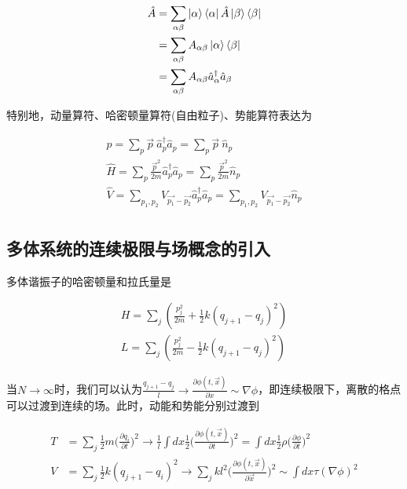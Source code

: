 \begin{equation}
	\begin{split}
		\hat{A} &= \sum_{\alpha\beta}\ket{\alpha}\bra{\alpha}\hat{A}\ket{\beta}\bra{\beta} \\
			&= \sum_{\alpha\beta}A_{\alpha\beta}\ket{\alpha}\bra{\beta} \\
			&= \sum_{\alpha\beta}A_{\alpha\beta}\hat{a}_\alpha^\dagger\hat{a}_\beta
	\end{split}
\end{equation}

特别地，动量算符、哈密顿量算符(自由粒子)、势能算符表达为

\begin{equation}
	\begin{array}{lr}
		\hat{p}= \sum_{p}\vec{p}\ \hat{a}_{p}^\dagger\hat{a}_{p}=\sum_{p}\vec{p}\ \hat{n}_{p}\\
		\hat{H}= \sum_{p}\frac{\vec{p}^2}{2m}\hat{a}_{p}^\dagger\hat{a}_{p}=\sum_{p}\frac{\vec{p}^2}{2m}\hat{n}_{p}\\
		\hat{V}= \sum_{p_{1},p_{2}}V_{\vec{p_{1}}-\vec{p_{2}}}\hat{a}_{p}^\dagger\hat{a}_{p}
           =\sum_{p_{1},p_{2}}V_{\vec{p_{1}}-\vec{p_{2}}}\hat{n}_{p}\\
	\end{array}
\end{equation}




\subsection{多体系统的连续极限与场概念的引入}

多体谐振子的哈密顿量和拉氏量是

\begin{equation}
	\begin{array}{lr}
		H=\sum_{j}(\frac{p_j^2}{2m}+\frac{1}{2}k(q_{j+1}-q_j)^2) \\
		L=\sum_{j}(\frac{p_j^2}{2m}-\frac{1}{2}k(q_{j+1}-q_j)^2)
	\end{array}
\end{equation}

当$N\to\infty$时，我们可以认为$\frac{q_{j+1}-q_j}{l}\to\frac{\partial\phi(t,\vec{x})}{\partial x}\sim\nabla\phi$，即连续极限下，离散的格点可以过渡到连续的场。此时，动能和势能分别过渡到

\begin{equation}
    \begin{split}
        T &= \sum_j\frac{1}{2}m\bigl(\frac{\partial q_i}{\partial t}\bigr)^2 \to \frac{1}{l}\int dx\frac{1}{2}\bigl(\frac{\partial\phi(t,\vec{x})}{\partial t}\bigr)^2 = \int dx\frac{1}{2}\rho\bigl(\frac{\partial\phi}{\partial t}\bigr)^2 \\
        V &= \sum_j\frac{1}{2}k(q_{j+1}-q_i)^2 \to \sum_jkl^2\bigl(\frac{\partial\phi(t,\vec{x})}{\partial \vec{x}}\bigr)^2 \sim \int dx \tau(\nabla\phi)^2
    \end{split}
\end{equation}

